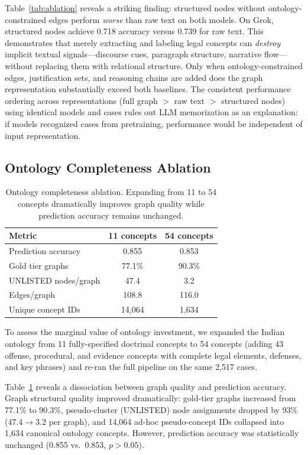 \documentclass[11pt]{article}
\begin{document}
Table~\ref{tab:ablation} reveals a striking finding: structured nodes without ontology-constrained edges perform \emph{worse} than raw text on both models. On Grok, structured nodes achieve 0.718 accuracy versus 0.739 for raw text. This demonstrates that merely extracting and labeling legal concepts can \emph{destroy} implicit textual signals---discourse cues, paragraph structure, narrative flow---without replacing them with relational structure. Only when ontology-constrained edges, justification sets, and reasoning chains are added does the graph representation substantially exceed both baselines. The consistent performance ordering across representations (full graph $>$ raw text $>$ structured nodes) using identical models and cases rules out LLM memorization as an explanation: if models recognized cases from pretraining, performance would be independent of input representation.

\subsection{Ontology Completeness Ablation}

\begin{table}[t]
\small
\centering
\caption{Ontology completeness ablation. Expanding from 11 to 54 concepts dramatically improves graph quality while prediction accuracy remains unchanged.}
\label{tab:ont_ablation}
\begin{tabular}{lcc}
\toprule
Metric & 11 concepts & 54 concepts \\
\midrule
Prediction accuracy & 0.855 & 0.853 \\
Gold tier graphs & 77.1\% & 90.3\% \\
UNLISTED nodes/graph & 47.4 & 3.2 \\
Edges/graph & 108.8 & 116.0 \\
Unique concept IDs & 14,064 & 1,634 \\
\bottomrule
\end{tabular}
\end{table}

To assess the marginal value of ontology investment, we expanded the Indian ontology from 11 fully-specified doctrinal concepts to 54 concepts (adding 43 offense, procedural, and evidence concepts with complete legal elements, defenses, and key phrases) and re-ran the full pipeline on the same 2,517 cases.

Table~\ref{tab:ont_ablation} reveals a dissociation between graph quality and prediction accuracy. Graph structural quality improved dramatically: gold-tier graphs increased from 77.1\% to 90.3\%, pseudo-cluster (UNLISTED) node assignments dropped by 93\% (47.4$\rightarrow$3.2 per graph), and 14,064 ad-hoc pseudo-concept IDs collapsed into 1,634 canonical ontology concepts. However, prediction accuracy was statistically unchanged (0.855 vs.\ 0.853, $p > 0.05$).
\end{document}
